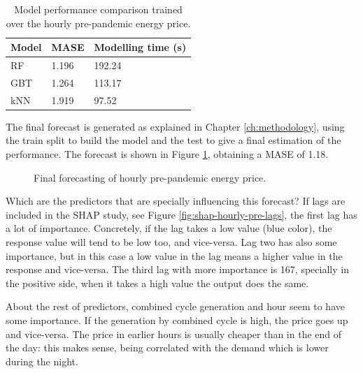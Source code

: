 \begin{table}[H]
\centering
\begin{tabular}{@{}l|l|l@{}}
\toprule
Model & MASE  & Modelling time (s)  \\ \midrule
RF    & 1.196 & 192.24              \\
GBT   & 1.264 & 113.17              \\
kNN   & 1.919 & 97.52               \\ \bottomrule
\end{tabular}
\caption{Model performance comparison trained over the hourly pre-pandemic energy price.}
\label{tab:cv-hourly-prep}
\end{table}

The final forecast is generated as explained in Chapter \ref{ch:methodology}, using the train split to build the model and the test to give a final estimation of the performance. The forecast is shown in Figure \ref{fig:forecast-hourly-pre}, obtaining a MASE of 1.18.

\begin{figure}[H]
\centering
    \caption{Final forecasting of hourly pre-pandemic energy price.}
    \label{fig:forecast-hourly-pre}
\end{figure}

Which are the predictors that are specially influencing this forecast? If lags are included in the SHAP study, see Figure \ref{fig:shap-hourly-pre-lags}, the first lag has a lot of importance. Concretely, if the lag takes a low value (blue color), the response value will tend to be low too, and vice-versa. Lag two has also some importance, but in this case a low value in the lag means a higher value in the response and vice-versa. The third lag with more importance is 167, specially in the positive side, when it takes a high value the output does the same.

About the rest of predictors, combined cycle generation and hour seem to have some importance. If the generation by combined cycle is high, the price goes up and vice-versa. The price in earlier hours is usually cheaper than in the end of the day: this makes sense, being correlated with the demand which is lower during the night.

